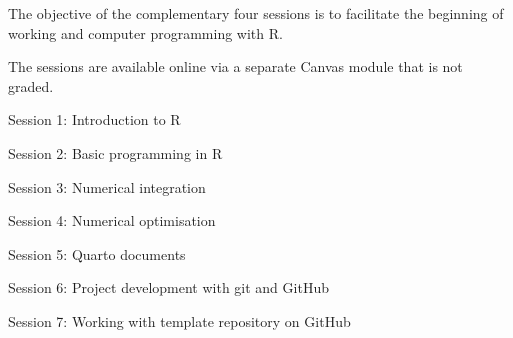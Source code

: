 \documentclass[10pt]{article}
\begin{document}
\begin{multicols}{2}
\smallskip\noindent The objective of the complementary four sessions is to facilitate the beginning of working and computer programming with R. 

\smallskip\noindent The sessions are available online via a separate Canvas module that is not graded. 

\smallskip\noindent Session 1: Introduction to R

\smallskip\noindent Session 2: Basic programming in R

\smallskip\noindent Session 3: Numerical integration

\smallskip\noindent Session 4: Numerical optimisation

\smallskip\noindent Session 5: Quarto documents

\smallskip\noindent Session 6: Project development with git and GitHub

\smallskip\noindent Session 7: Working with template repository on GitHub


\vfill\null
\columnbreak


\end{multicols}
\end{document}
